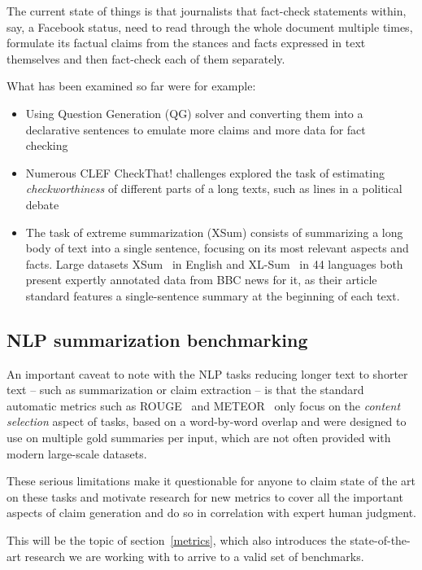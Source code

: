 The current state of things is that journalists that fact-check statements within, say, a Facebook status, need to read through the whole document multiple times, formulate its factual claims from the stances and facts expressed in text themselves and then fact-check each of them separately.

What has been examined so far were for example:
\begin{itemize}
    \item Using Question Generation (QG) solver and converting them into a declarative sentences to emulate more claims and more data for fact checking~\cite{pan2021zeroshot}
    \item Numerous CLEF CheckThat! challenges explored the task of estimating \textit{checkworthiness} of different parts of a long texts, such as lines in a political debate~\cite{clef19,clef21}
    \item The task of extreme summarization (XSum) consists of summarizing a long body of text into a single sentence, focusing on its most relevant aspects and facts. Large datasets XSum~\cite{narayan-etal-2018-dont} in English and XL-Sum~\cite{xlsum} in 44 languages both present expertly annotated data from BBC news for it, as their article standard features a single-sentence summary at the beginning of each text.
\end{itemize}

\subsection{NLP summarization benchmarking}
An important caveat to note with the NLP tasks reducing longer text to shorter text -- such as summarization or claim extraction -- is that the standard automatic metrics such as ROUGE~\cite{lin-2004-rouge} and METEOR~\cite{banerjee-lavie-2005-meteor} only focus on the \textit{content selection} aspect of tasks, based on a word-by-word overlap and were designed to use on multiple gold summaries per input, which are not often provided with modern large-scale datasets.~\cite{nlpprogress,bert-score,zha2023alignscore}

These serious limitations make it questionable for anyone to claim state of the art on these tasks and motivate research for new metrics to cover all the important aspects of claim generation and do so in correlation with expert human judgment. 

This will be the topic of section~\ref{metrics}, which also introduces the state-of-the-art research we are working with to arrive to a valid set of benchmarks.